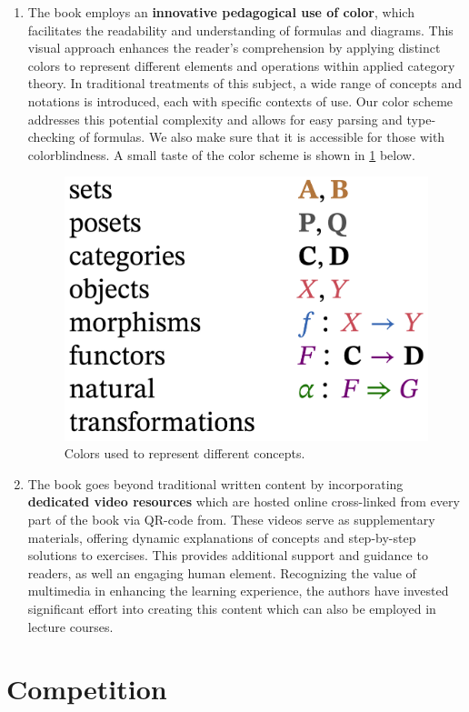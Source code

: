 \documentclass[10pt, article, one side]{memoir}
\begin{document}
\begin{enumerate}
        \item   The book employs an \textbf{innovative pedagogical use of color}, which facilitates the readability and understanding of formulas and diagrams. This visual approach enhances the reader's comprehension by applying distinct colors to represent different elements and operations within applied category theory. In traditional treatments of this subject, a wide range of concepts and notations is introduced, each with specific contexts of use. Our color scheme addresses this potential complexity and allows for easy parsing and type-checking of formulas. We also make sure that it is accessible for those with colorblindness. A small taste of the color scheme is shown in \cref{fig:use-colors} below. 
              \begin{figure}[h]
                  \begin{center}
                      \includegraphics[width=0.3\linewidth]{pics/use_colors}
                  \end{center}
                  \caption{Colors used to represent different concepts. \label{fig:use-colors}}
              \end{figure}
              
              
        \item The book goes beyond traditional written content by incorporating \textbf{dedicated video resources} which are hosted online cross-linked from every part of the book via QR-code from. These videos serve as supplementary materials, offering dynamic explanations of concepts and step-by-step solutions to exercises. This provides additional support and guidance to readers, as well an engaging human element. Recognizing the value of multimedia in enhancing the learning experience, the authors have invested significant effort into creating this content which can also be employed in lecture courses.  
          
    \end{enumerate}

    \section{Competition}
    \label{sec:competition}
\end{document}
